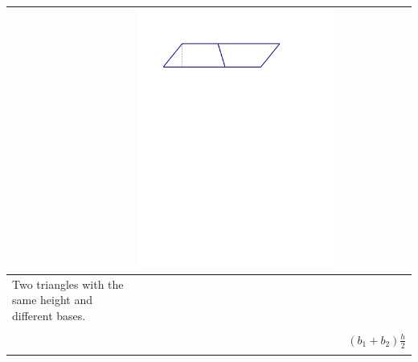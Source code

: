 \documentclass{ximera}
\begin{document}
\begin{problem}
{\begin{tabular}{|>{\centering\arraybackslash}m{2.5cm}|>{\centering\arraybackslash}m{9.5cm}|c|}
                              & \includegraphics[scale=0.7]{./graphics/trapezoid3.pdf} &                      \\ \hline
Two triangles with the same height and different bases. &                 & \\ \hline
 & & \\ 
\bigskip                              &  & $(b_1+b_2)\frac{h}{2}$ \\ 
 & & \\ \hline

\end{tabular}}
\end{problem}
\end{document}
